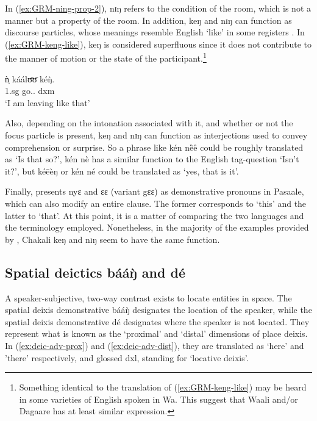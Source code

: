 \begin{exe}
\begin{exe}
\begin{exe}
{\begin{exe}
\begin{exe}
\begin{exe}
\begin{exe}
\begin{exe}
\begin{exe}
\begin{exe}
\begin{exe}
\begin{exe}
\begin{exe}
\begin{exe}
\begin{exe}
\begin{exe}
\begin{exe}
\begin{exe}
\begin{exe}
\begin{exe}
\begin{exe}
\begin{exe}
\begin{exe}
\begin{exe}
In (\ref{ex:GRM-ning-prop-2}), {\sls nɪŋ} refers to the condition of  the room,
which is not a manner  but a property of the room. 
In addition, {\sls keŋ} and 
{\sls nɪŋ} can function as  discourse particles, whose
meanings resemble   English `like' in some registers \citep{Muff02}. In
(\ref{ex:GRM-keng-like}), {\sls keŋ} is considered superfluous since it does not
contribute to the manner of  motion or the state of the
participant.\footnote{Something identical to the translation of
(\ref{ex:GRM-keng-like}) may be heard in some varieties of  English spoken in 
Wa.
This suggest that Waali and/or Dagaare has at least  similar 
expression.} 
 
 \ea\label{ex:GRM-keng-like} 
 \gll ǹ̩ káálʊ̄ʊ̄ kéŋ̀.\\
 {\sc 1.sg} go.{\ipfv .\foc}  {\sc dxm}\\
 \glt `I am leaving like that'
\z

Also, depending on the intonation associated with it, and whether or not  the
focus
particle  is  present, {\sls keŋ} and {\sls nɪŋ} can function as
interjections used to convey comprehension or surprise. So a phrase like {\sls 
kén nȅȅ} could be roughly translated as `Is that so?', {\sls kén nè}   has 
a
similar function to the English  tag-question `Isn't it?', but {\sls kéēèŋ} 
or
{\sls kén né} could be translated as `yes, that is it'. 

Finally, \citet{Mcgi99} presents  {\sls nyɛ} and {\sls ɛɛ} (variant {\sls gɛɛ}) 
as
demonstrative pronouns in Pasaale, which can also modify an entire clause. The
former
corresponds to `this' and the latter to `that'. At this point, it is a matter of
comparing the two languages and the terminology employed.  Nonetheless, in the
majority of the examples provided by \citet{Mcgi99}, Chakali {\sls keŋ} and 
{\sls 
nɪŋ} seem to have the same function. 


\subsection{Spatial deictics {\sls bááŋ̀} and  {\sls dé}}
\label{sec:GRM-deic-adv}
 

A speaker-subjective,  two-way contrast  exists to locate entities in space. 
The spatial deixis demonstrative  {\sls bááŋ̀} designates the location of the 
speaker, while 
the spatial deixis demonstrative  {\sls dé} designates  where the
speaker is not located. They represent what is known as the `proximal' and
`distal' 
dimensions of  place deixis. In (\ref{ex:deic-adv-prox}) and
(\ref{ex:deic-adv-dist}),  they are translated as `here' and 'there'
respectively, and glossed {\sc dxl}, standing for `locative deixis'.  



\end{exe}
\end{exe}
\end{exe}
\end{exe}
\end{exe}
\end{exe}
\end{exe}
\end{exe}
\end{exe}
\end{exe}
\end{exe}
\end{exe}
\end{exe}
\end{exe}
\end{exe}
\end{exe}
\end{exe}
\end{exe}
\end{exe}
\end{exe}
\end{exe}}
\end{exe}
\end{exe}
\end{exe}
